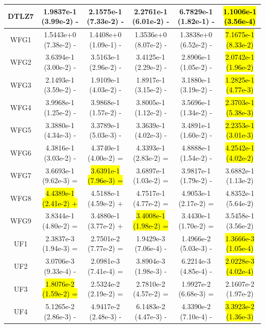 \documentclass[journal]{IEEEtran}
\begin{document}
\begin{table}[]
\begin{tabular}{cccccc}
    DTLZ7   & 1.9837e-1 (3.99e-2) -      & 2.1575e-1 (7.33e-2) -      & 2.2761e-1 (6.01e-2) -      & 6.7829e-1 (1.82e-1) -      & \hl{1.1006e-1 (3.56e-4)} \\
    \hline
    WFG1    & 1.5443e+0 (7.38e-2) -      & 1.4408e+0 (1.09e-1) -      & 1.3536e+0 (8.07e-2) -      & 1.3838e+0 (6.52e-2) -      & \hl{7.1675e-1 (8.33e-2)} \\
    WFG2    & 3.6394e-1 (3.00e-2) -      & 3.5163e-1 (2.96e-2) -      & 3.4125e-1 (2.29e-2) -      & 2.8906e-1 (1.05e-2) -      & \hl{2.0742e-1 (1.96e-2)} \\
    WFG3    & 2.1493e-1 (3.59e-2) -      & 1.9109e-1 (4.03e-2) -      & 1.8917e-1 (3.15e-2) -      & 3.1880e-1 (3.19e-2) -      & \hl{1.2825e-1 (4.77e-3)} \\
    WFG4    & 3.9968e-1 (1.25e-2) -      & 3.9868e-1 (1.57e-2) -      & 3.8005e-1 (1.12e-2) -      & 3.5696e-1 (1.34e-2) -      & \hl{2.3703e-1 (5.38e-3)} \\
    WFG5    & 3.3880e-1 (4.34e-3) -      & 3.3789e-1 (5.03e-3) -      & 3.3639e-1 (4.02e-3) -      & 3.4891e-1 (1.60e-2) -      & \hl{2.2353e-1 (3.01e-3)} \\
    WFG6    & 4.3816e-1 (3.03e-2) -      & 4.3740e-1 (4.00e-2) =      & 4.3393e-1 (2.83e-2) =      & 4.8888e-1 (1.54e-2) -      & \hl{4.2542e-1 (4.02e-2)} \\
    WFG7    & 3.6693e-1 (9.62e-3) =      & \hl{3.6391e-1 (7.96e-3) =} & 3.6897e-1 (1.03e-2) =      & 3.9817e-1 (1.79e-2) -      & 3.6882e-1 (1.13e-2)      \\
    WFG8    & \hl{4.4389e-1 (2.41e-2) +} & 4.5188e-1 (4.59e-2) +      & 4.7517e-1 (4.77e-2) =      & 4.9053e-1 (2.17e-2) =      & 4.8352e-1 (5.64e-2)      \\
    WFG9    & 3.8344e-1 (4.80e-2) =      & 3.4880e-1 (3.77e-2) +      & \hl{3.4008e-1 (1.98e-2) =} & 3.4430e-1 (1.70e-2) =      & 3.5458e-1 (3.56e-2)      \\
    \hline
    UF1     & 2.3837e-3 (1.94e-3) =      & 2.7501e-2 (7.77e-2) =      & 1.9429e-3 (7.06e-4) -      & 1.4966e-2 (5.03e-3) -      & \hl{1.3666e-3 (1.05e-4)} \\
    UF2     & 3.0706e-3 (9.33e-4) -      & 2.0981e-3 (7.41e-4) =      & 3.8904e-3 (1.98e-3) -      & 6.2214e-3 (4.85e-4) -      & \hl{2.0228e-3 (4.02e-4)} \\
    UF3     & \hl{1.8076e-2 (1.59e-2) =} & 2.5324e-2 (2.19e-2) =      & 2.7810e-2 (4.57e-2) =      & 1.9927e-2 (6.68e-3) =      & 2.1607e-2 (1.97e-2)      \\
    UF4     & 5.1265e-2 (2.86e-3) -      & 4.9417e-2 (2.48e-3) -      & 6.1483e-2 (4.47e-3) -      & 4.3390e-2 (7.10e-4) -      & \hl{3.3923e-2 (1.36e-3)} \\

\end{tabular}
\end{table}
\end{document}
